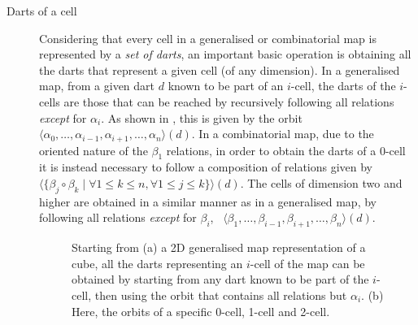 \begin{description}

\item[Darts of a cell]
Considering that every cell in a generalised or combinatorial map is represented by a \emph{set of darts}, an important basic operation is obtaining all the darts that represent a given cell (of any dimension).
In a generalised map, from a given dart $d$ known to be part of an $i$-cell, the darts of the $i$-cells are those that can be reached by recursively following all relations \emph{except} for $\alpha_i$.
As shown in , this is given by the orbit $\langle\alpha_0, \ldots, \alpha_{i-1}, \alpha_{i+1}, \ldots, \alpha_n\rangle(d)$.
In a combinatorial map, due to the oriented nature of the $\beta_1$ relations, in order to obtain the darts of a $0$-cell it is instead necessary to follow a composition of relations given by $\langle \{\beta_j\circ \beta_k \mid \forall 1 \leq k \leq n, \forall 1 \leq j \leq k\} \rangle(d)$.
The cells of dimension two and higher are obtained in a similar manner as in a generalised map, by following all relations \emph{except} for $\beta_i$, \ie\ $\langle\beta_1, \ldots, \beta_{i-1}, \beta_{i+1}, \ldots, \beta_n\rangle(d)$.
\begin{figure}[tbp]
\centering
{}
\quad
{}
\caption[Darts of a cell]{Starting from (a) a 2D generalised map representation of a cube, all the darts representing an $i$-cell of the map can be obtained by starting from any dart known to be part of the $i$-cell, then using the orbit that contains all relations but $\alpha_i$. (b) Here, the orbits of a specific 0-cell, 1-cell and 2-cell.}
\label{fig:darts-of-cell}
\end{figure}


\end{description}
